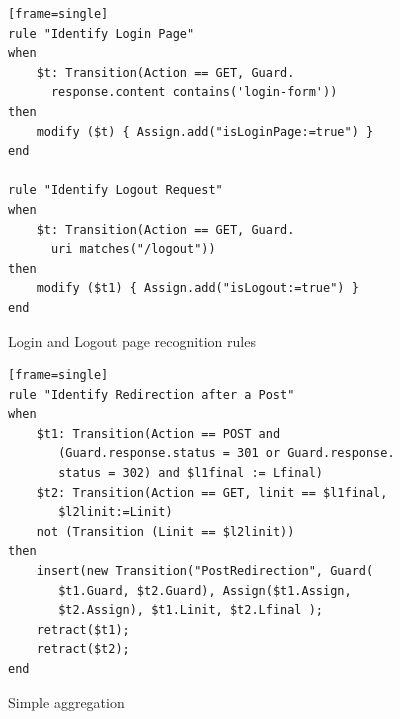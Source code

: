 \begin{figure}[ht]
\begin{center}
\begin{scriptsize}
\begin{verbatim}[frame=single]
rule "Identify Login Page"
when
    $t: Transition(Action == GET, Guard.
      response.content contains('login-form'))
then
    modify ($t) { Assign.add("isLoginPage:=true") }
end

rule "Identify Logout Request"
when
    $t: Transition(Action == GET, Guard.
      uri matches("/logout"))
then
    modify ($t1) { Assign.add("isLogout:=true") }
end

\end{verbatim}
\end{scriptsize}
\end{center}

\caption {Login and Logout page recognition rules}
\label{fig:rule:login}
\end{figure}

\begin{figure}[ht]
\begin{center}
\begin{scriptsize}
\begin{verbatim}[frame=single]
rule "Identify Redirection after a Post"
when
    $t1: Transition(Action == POST and
       (Guard.response.status = 301 or Guard.response.
       status = 302) and $l1final := Lfinal)
    $t2: Transition(Action == GET, linit == $l1final,
       $l2linit:=Linit)
    not (Transition (Linit == $l2linit))
then
    insert(new Transition("PostRedirection", Guard(
       $t1.Guard, $t2.Guard), Assign($t1.Assign,
       $t2.Assign), $t1.Linit, $t2.Lfinal );
    retract($t1);
    retract($t2);
end
\end{verbatim}
\end{scriptsize}

\caption {Simple aggregation} \label{fig:rule:redirect}
\end{center}
\end{figure}

